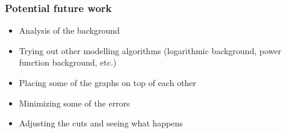 \documentclass{beamer}
\begin{document}
\frame %
{
\frametitle{Potential future work}
\begin{itemize}
\item<1->Analysis of the background\\

\item<2>Trying out other modelling algorithms (logarithmic background, power function background, etc.)\\

\item<3>Placing some of the graphs on top of each other\\

\item<4>Minimizing some of the errors\\

\item<5>Adjusting the cuts and seeing what happens
\end{itemize}
}
\end{document}
